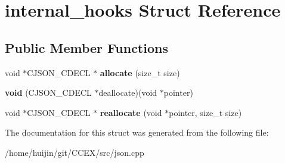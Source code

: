 \hypertarget{structinternal__hooks}{\section{internal\-\_\-hooks Struct Reference}
\label{structinternal__hooks}
}
\subsection*{Public Member Functions}
\begin{DoxyCompactItemize}
\item 
\hypertarget{structinternal__hooks_a872a0c28217b451331d24b8e0484b293}{void $\ast$C\-J\-S\-O\-N\-\_\-\-C\-D\-E\-C\-L $\ast$ {\bfseries allocate} (size\-\_\-t size)}\label{structinternal__hooks_a872a0c28217b451331d24b8e0484b293}

\item 
\hypertarget{structinternal__hooks_a5cc2dd5383da5f20b19e0f27fa59e123}{{\bfseries void} (C\-J\-S\-O\-N\-\_\-\-C\-D\-E\-C\-L $\ast$deallocate)(void $\ast$pointer)}\label{structinternal__hooks_a5cc2dd5383da5f20b19e0f27fa59e123}

\item 
\hypertarget{structinternal__hooks_a5dd48d5c2f2b1cf4f6eec5df6205e15c}{void $\ast$C\-J\-S\-O\-N\-\_\-\-C\-D\-E\-C\-L $\ast$ {\bfseries reallocate} (void $\ast$pointer, size\-\_\-t size)}\label{structinternal__hooks_a5dd48d5c2f2b1cf4f6eec5df6205e15c}

\end{DoxyCompactItemize}


The documentation for this struct was generated from the following file\-:\begin{DoxyCompactItemize}
\item 
/home/huijin/git/\-C\-C\-E\-X/src/json.\-cpp\end{DoxyCompactItemize}
